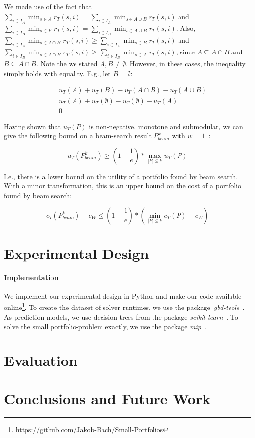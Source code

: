 \documentclass[conference]{IEEEtran}
\begin{document}
We made use of the fact that $\sum_{i \in I_A}{\min_{s \in A}{r_T(s,i)}} = \sum_{i \in I_A}{\min_{s \in A \cup B}{r_T(s,i)}}$ and $\sum_{i \in I_B}{\min_{s \in B}{r_T(s,i)}} = \sum_{i \in I_B}{\min_{s \in A \cup B}{r_T(s,i)}}$.
Also, $\sum_{i \in I_A}{\min_{s \in A \cap B}{r_T(s,i)}} \geq \sum_{i \in I_A}{\min_{s \in B}{r_T(s,i)}}$ and $\sum_{i \in I_B}{\min_{s \in A \cap B}{r_T(s,i)}} \geq \sum_{i \in I_B}{\min_{s \in A}{r_T(s,i)}}$, since $A \subseteq A \cap B$ and $B \subseteq A \cap B$.
Note the we stated $A,B \neq \emptyset$.
However, in these cases, the inequality simply holds with equality.
E.g., let $B = \emptyset$:

\begin{align*}
	& u_{T}(A) + u_{T}(B) - u_{T}(A \cap B) - u_{T}(A \cup B)\\
	= & u_{T}(A) + u_{T}(\emptyset) - u_{T}(\emptyset) - u_{T}(A)\\
	= & 0
\end{align*}

Having shown that $u_{T}(P)$ is non-negative, monotone and submodular, we can give the following bound on a beam-search result $P_{beam}^k$ with $w=1$~\cite{nemhauser1978analysis, krause2014submodular}:

\begin{equation}
	u_{T}(P_{beam}^k) \geq (1 - \frac{1}{e}) * \max_{|P| \leq k}{u_{T}(P)}
\end{equation}

I.e., there is a lower bound on the utility of a portfolio found by beam search.
With a minor transformation, this is an upper bound on the cost of a portfolio found by beam search:

\begin{equation}
	c_{T}(P_{beam}^k) - c_W \leq (1 - \frac{1}{e}) * (\min_{|P| \leq k}{c_{T}(P)} - c_W)
\end{equation}

\section{Experimental Design}
\label{sec:experimental-design}

\paragraph{Implementation}

We implement our experimental design in Python and make our code available online\footnote{\url{https://github.com/Jakob-Bach/Small-Portfolios}}.
To create the dataset of solver runtimes, we use the package~\emph{gbd-tools}~\cite{iser2020collaborative}.
As prediction models, we use decision trees from the package \emph{scikit-learn}~\cite{scikit-learn}.
To solve the small portfolio-problem exactly, we use the package \emph{mip}~\cite{python-mip}.

\section{Evaluation}
\label{sec:evaluation}

\section{Conclusions and Future Work}
\label{sec:conclusion}




\end{document}
